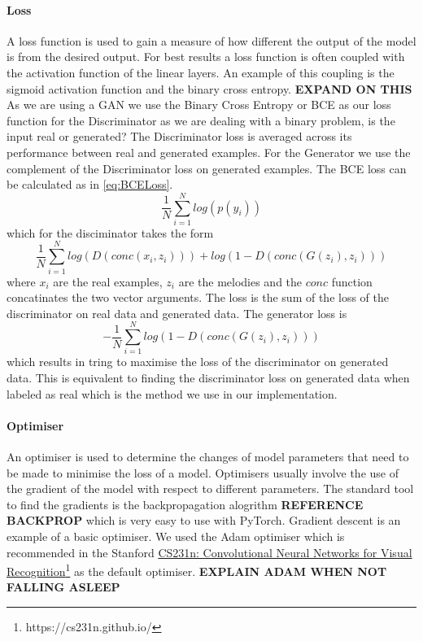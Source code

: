 \paragraph{Loss}
A loss function is used to gain a measure of how different the output of the model is from the desired output.
For best results a loss function is often coupled with the activation function of the linear layers.
An example of this coupling is the sigmoid activation function and the binary cross entropy. \textbf{EXPAND ON THIS}
As we are using a GAN we use the Binary Cross Entropy or BCE as our loss function for the Discriminator as we are dealing with a binary problem, is the input real or generated?
The Discriminator loss is averaged across its performance between real and generated examples.
For the Generator we use the complement of the Discriminator loss on generated examples.
The BCE loss can be calculated as in \ref{eq:BCELoss}.
\begin{equation}
    \label{eq:BCELoss}
    \frac{1}{N} \sum_{i=1}^N log(p(y_i))
\end{equation}
    which for the disciminator takes the form
\begin{equation}
    \frac{1}{N} \sum_{i=1}^N log(D(conc(x_i,z_i))) + log(1-D(conc(G(z_i),z_i)))
\end{equation}
    where $x_i$ are the real examples, $z_i$ are the melodies and the $conc$ function concatinates the two vector arguments.
    The loss is the sum of the loss of the discriminator on real data and generated data.
    The generator loss is
\begin{equation}
    -\frac{1}{N} \sum_{i=1}^N log(1-D(conc(G(z_i),z_i)))
\end{equation}
    which results in tring to maximise the loss of the discriminator on generated data.
    This is equivalent to finding the discriminator loss on generated data when labeled as real which is the method we use in our implementation.

    
\paragraph{Optimiser}
An optimiser is used to determine the changes of model parameters that need to be made to minimise the loss of a model.
Optimisers usually involve the use of the gradient of the model with respect to different parameters.
The standard tool to find the gradients is the backpropagation alogrithm \textbf{REFERENCE BACKPROP} which is very easy to use with PyTorch.
Gradient descent is an example of a basic optimiser.
We used the Adam optimiser \cite{Adam} which is recommended in the Stanford \href{https://cs231n.github.io/}{CS231n: Convolutional Neural Networks for Visual Recognition}\footnote{https://cs231n.github.io/} as the default optimiser.
\textbf{EXPLAIN ADAM WHEN NOT FALLING ASLEEP}



